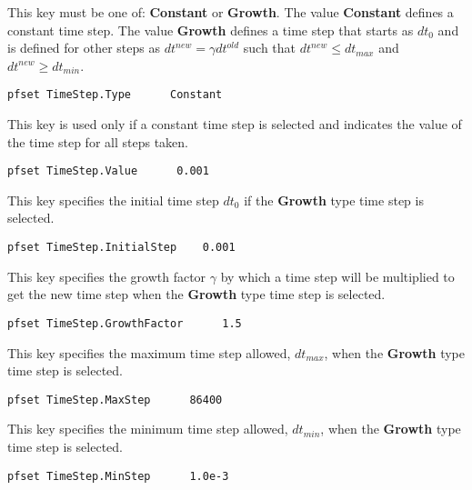 {
This key must be one of: {\bf Constant} or {\bf Growth}.  The value
{\bf Constant} defines a constant time step.  The value {\bf Growth}
defines a time step that starts as $dt_0$ and is defined for
other steps as $dt^{new} = \gamma dt^{old}$ such that $dt^{new} \leq
dt_{max}$ and $dt^{new} \geq dt_{min}$.
}
\begin{display}\begin{verbatim}
pfset TimeStep.Type      Constant
\end{verbatim}\end{display}

{
This key is used only if a constant time step is selected and indicates
the value of the time step for all steps taken.
}
\begin{display}\begin{verbatim}
pfset TimeStep.Value      0.001
\end{verbatim}\end{display}

{
This key specifies the initial time step $dt_0$ if the {\bf Growth} type time
step is selected.
}
\begin{display}\begin{verbatim}
pfset TimeStep.InitialStep    0.001
\end{verbatim}\end{display}

{
This key specifies the growth factor $\gamma$ by which a time step will be
multiplied to get the new time step when the {\bf Growth} type time step is
selected.
}
\begin{display}\begin{verbatim}
pfset TimeStep.GrowthFactor      1.5
\end{verbatim}\end{display}

{
This key specifies the maximum time step allowed, $dt_{max}$, when the {\bf
Growth} type time step is selected.
}
\begin{display}\begin{verbatim}
pfset TimeStep.MaxStep      86400
\end{verbatim}\end{display}

{
This key specifies the minimum time step allowed, $dt_{min}$, when the {\bf
Growth} type time step is selected.
}
\begin{display}\begin{verbatim}
pfset TimeStep.MinStep      1.0e-3
\end{verbatim}\end{display}

